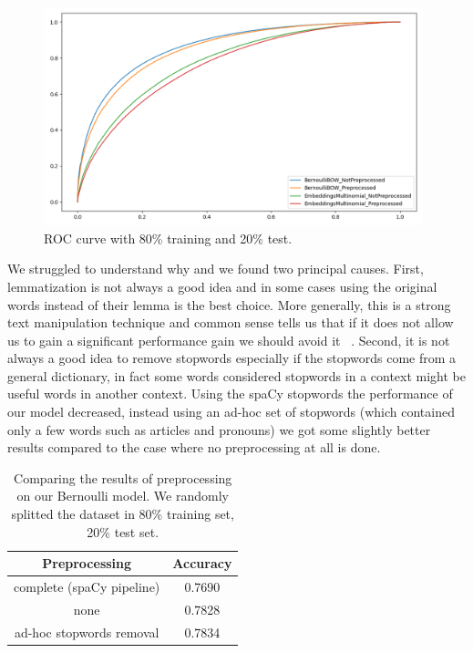 \begin{figure}[h!t]
    \centering
    \includegraphics[width=11cm]{../experiments/plots/preprocessing.png}
    \caption{ROC curve with 80\% training and 20\% test.}
    \label{fig:PREPROCESSING_ROC}
\end{figure}


We struggled to understand why and we found two principal causes.
First, lemmatization is not always a good idea and in some cases using the original words instead of their lemma is the best choice.
More generally, this is a strong text manipulation technique and common sense tells us that if it does not allow us to gain a significant performance gain we should avoid it ~\cite{data:lemmatization_tips}. 
Second, it is not always a good idea to remove stopwords especially if the stopwords come from a general dictionary, in fact some words considered stopwords in a context might be useful words in another context. 
Using the spaCy stopwords the performance of our model decreased, instead using an ad-hoc set of stopwords (which contained only a few words such as articles and pronouns) we got some slightly better results compared to the case where no preprocessing at all is done.


\begin{table}[h!t]
    \centering
    \caption{Comparing the results of preprocessing on our Bernoulli model. We randomly splitted the dataset in 80\% training set, 20\% test set.}
    \label{tab:stopwords}
    \begin{tabular}{c|c}
        \hline
        Preprocessing & Accuracy \\
        \hline 
        complete (spaCy pipeline) & 0.7690 \\ 
        none & 0.7828 \\ 
        ad-hoc stopwords removal & 0.7834 \\ 
        \hline
    \end{tabular}
\end{table}
